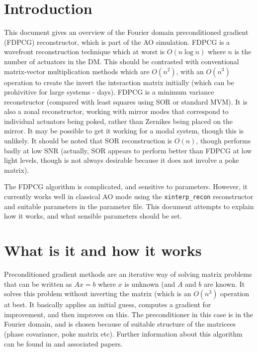 \documentclass{article}
\begin{document}

\renewcommand{\esotitle}{FDPCG reconstruction}
\renewcommand{\esodocno}{AOSIM-PCG-UoD-001}
\renewcommand{\releasedate}{070329}

\section{Introduction}
This document gives an overview of the Fourier domain preconditioned
gradient (FDPCG) reconstructor, which is part of the AO simulation.
FDPCG is a wavefront reconstruction technique which at worst is $O(n
\log n)$ where $n$ is the number of actuators in the DM.  This should
be contrasted with conventional matrix-vector multiplication methods
which are $O(n^2)$, with an $O(n^3)$ operation to create the invert
the interaction matrix initially (which can be prohivitive for large
systems - days).  FDPCG is a minimum variance reconstructor (compared
with least squares using SOR or standard MVM).  It is also a zonal
reconstructor, working with mirror modes that correspond to individual
actuators being poked, rather than Zernikes being placed on the
mirror.  It may be possible to get it working for a modal system,
though this is unlikely.  It should be noted that SOR reconstruction
is $O(n)$, though performs badly at low SNR (actually, SOR appears to
perform better than FDPCG at low light levels, though is not always
desirable because it does not involve a poke matrix).

The FDPCG algorithm is complicated, and sensitive to parameters.
However, it currently works well in classical AO mode using the
\texttt{xinterp\_recon} reconstructor and suitable parameters in the
parameter file.  This document attempts to explain how it works, and
what sensible parameters should be set.

\section{What is it and how it works}
Preconditioned gradient methods are an iterative way of solving matrix
problems that can be written as $Ax=b$ where $x$ is unknown (and $A$
and $b$ are known.  It solves this problem without inverting the
matrix (which is an $O(n^3)$ operation at best.  It basically applies
an initial guess, computes a gradient for improvement, and then
improves on this.  The preconditioner in this case is in the Fourier
domain, and is chosen because of suitable structure of the matricees
(phase covariance, poke matrix etc).  Further information about this
algorithm can be found in \citet{2006ApOpt..45.5281Y} and associated
papers. 
\end{document}
